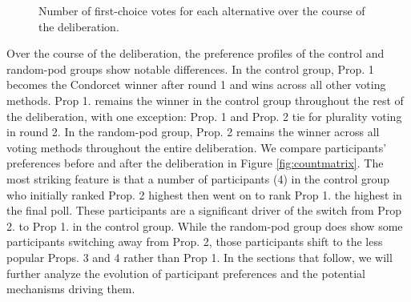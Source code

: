 {\begin{figure}
    \centering
    \caption{Number of first-choice votes for each alternative over the course of the deliberation.}
    \label{fig:firstplace}
\end{figure}

Over the course of the deliberation, the preference profiles of the control and random-pod groups show notable differences.
In the control group, Prop. 1 becomes the Condorcet winner after round 1 and wins across all other voting methods.
Prop 1. remains the winner in the control group throughout the rest of the deliberation, with one exception: Prop. 1 and Prop. 2 tie for plurality voting in round 2.
In the random-pod group, Prop. 2 remains the winner across all voting methods throughout the entire deliberation.
We compare participants' preferences before and after the deliberation in Figure \ref{fig:countmatrix}.
The most striking feature is that a number of participants (4) in the control group who initially ranked Prop. 2 highest then went on to rank Prop 1. the highest in the final poll.
These participants are a significant driver of the switch from Prop 2. to Prop 1. in the control group.
While the random-pod group does show some participants switching away from Prop. 2, those participants shift to the less popular Props. 3 and 4 rather than Prop 1.
In the sections that follow, we will further analyze the evolution of participant preferences and the potential mechanisms driving them.

}
